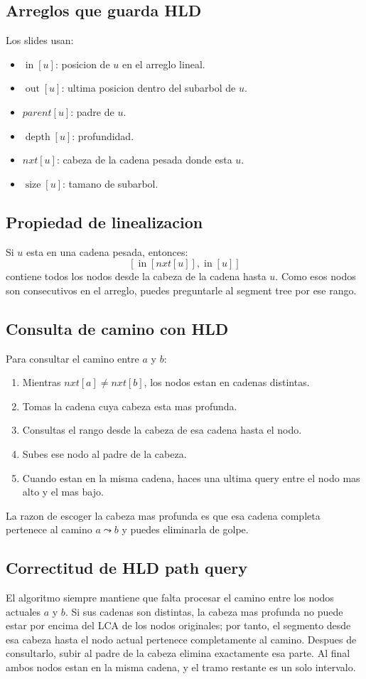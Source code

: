 \documentclass[10pt]{article}
\newcommand{\depth}{\operatorname{depth}}
\newcommand{\size}{\operatorname{size}}
\newcommand{\tin}{\operatorname{in}}
\newcommand{\tout}{\operatorname{out}}
\begin{document}
\subsection{Arreglos que guarda HLD}
Los slides usan:
\begin{itemize}[leftmargin=*]
\item $\tin[u]$: posicion de $u$ en el arreglo lineal.
\item $\tout[u]$: ultima posicion dentro del subarbol de $u$.
\item $parent[u]$: padre de $u$.
\item $\depth[u]$: profundidad.
\item $nxt[u]$: cabeza de la cadena pesada donde esta $u$.
\item $\size[u]$: tamano de subarbol.
\end{itemize}

\subsection{Propiedad de linealizacion}
Si $u$ esta en una cadena pesada, entonces:
\[
[\tin[nxt[u]],\tin[u]]
\]
contiene todos los nodos desde la cabeza de la cadena hasta $u$. Como esos nodos
son consecutivos en el arreglo, puedes preguntarle al segment tree por ese rango.

\subsection{Consulta de camino con HLD}
Para consultar el camino entre $a$ y $b$:
\begin{enumerate}[leftmargin=*]
\item Mientras $nxt[a]\ne nxt[b]$, los nodos estan en cadenas distintas.
\item Tomas la cadena cuya cabeza esta mas profunda.
\item Consultas el rango desde la cabeza de esa cadena hasta el nodo.
\item Subes ese nodo al padre de la cabeza.
\item Cuando estan en la misma cadena, haces una ultima query entre el nodo mas
alto y el mas bajo.
\end{enumerate}

La razon de escoger la cabeza mas profunda es que esa cadena completa pertenece
al camino $a\leadsto b$ y puedes eliminarla de golpe.

\subsection{Correctitud de HLD path query}
El algoritmo siempre mantiene que falta procesar el camino entre los nodos
actuales $a$ y $b$. Si sus cadenas son distintas, la cabeza mas profunda no
puede estar por encima del LCA de los nodos originales; por tanto, el segmento
desde esa cabeza hasta el nodo actual pertenece completamente al camino. Despues
de consultarlo, subir al padre de la cabeza elimina exactamente esa parte. Al
final ambos nodos estan en la misma cadena, y el tramo restante es un solo
intervalo.
\end{document}
